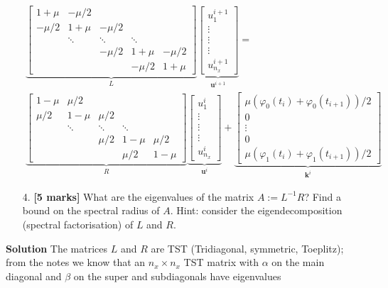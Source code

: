 \documentclass[12pt,a4paper]{article}
\begin{document}
\begin{eqnarray*}
&&
\underbrace{\begin{bmatrix}
1 + \mu & -\mu/2 & & & \\
-\mu/2  & 1+\mu & -\mu/2  & & \\
      & \ddots & \ddots & \ddots & \\
      &        & -\mu/2    & 1+ \mu & -\mu/2 \\
      &        &        &-\mu/2      & 1+\mu
\end{bmatrix}}_{L}
\underbrace{\begin{bmatrix}
u^{i+1}_{1} \\
\vdots \\
\vdots \\
\vdots \\
u^{i+1}_{n_x}
\end{bmatrix}}_{\mathbf{u}^{i+1}} = \\
&& 
\underbrace{\begin{bmatrix}
1 - \mu & \mu/2 & & & \\
\mu/2  & 1-\mu & \mu/2  & & \\
      & \ddots & \ddots & \ddots & \\
      &        & \mu/2    & 1- \mu & \mu/2 \\
      &        &        &\mu/2      & 1-\mu
\end{bmatrix}}_{R}
\underbrace{\begin{bmatrix}
u^{i}_{1} \\
\vdots \\
\vdots \\
\vdots \\
u^{i}_{n_x}
\end{bmatrix}}_{\mathbf{u}^i}
+
\underbrace{\begin{bmatrix}
\mu(\varphi_0(t_i) + \varphi_0(t_{i+1}))/2 \\
0 \\
\vdots \\
0 \\
\mu(\varphi_1(t_i) + \varphi_1(t_{i+1}))/2
\end{bmatrix}}_{\mathbf{k}^i}
\end{eqnarray*}
\begin{itemize}
\item[4. ] \textbf{[5 marks]} What are the eigenvalues of the matrix $A := L^{-1}R$? Find a bound on the spectral radius of $A$.   Hint: consider the eigendecomposition (spectral factorisation) of $L$ and $R$.

\end{itemize}
\textbf{Solution} The matrices $L$ and $R$ are TST (Tridiagonal, symmetric, Toeplitz); from the notes we know that an $n_x \times n_x$ TST matrix with $\alpha$ on the main diagonal and $\beta$ on the super and subdiagonals have eigenvalues 
\end{document}
